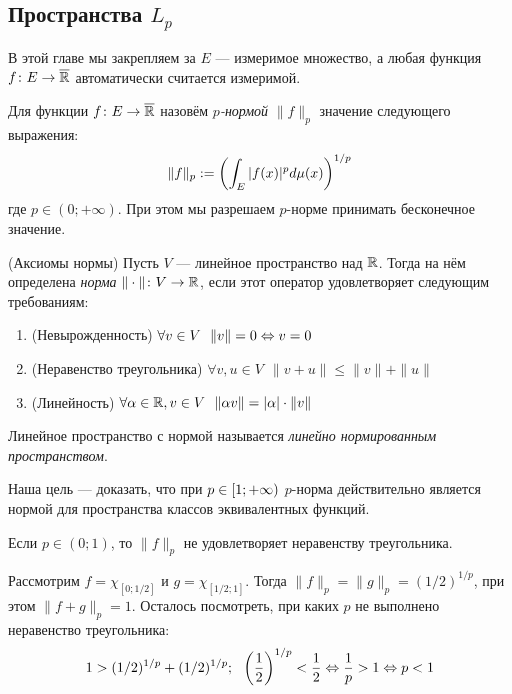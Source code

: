 \subsection{Пространства $L_p$}

\begin{note}
	В этой главе мы закрепляем за $E$ --- измеримое множество, а любая функция $f \colon E \to \overline{\mathbb{R}}$ автоматически считается измеримой.
\end{note}

\begin{definition}
	Для функции $f \colon E \to \overline{\mathbb{R}}$ назовём \textit{$p$-нормой} $\|f\|_p$ значение следующего выражения:
	\[
		\|f\|_p := \left(\int_E |f(x)|^pd\mu(x)\right)^{1/p}
	\]
	где $p \in (0; +\infty)$. При этом мы разрешаем $p$-норме принимать бесконечное значение.
\end{definition}

\begin{reminder} (Аксиомы нормы)
	Пусть $V$ --- линейное пространство над $\mathbb{R}$. Тогда на нём определена \textit{норма} $\|\cdot\| \colon V \to \mathbb{R}$, если этот оператор удовлетворяет следующим требованиям:
	\begin{enumerate}
		\item (Невырожденность) \(\forall v \in V\ \ \|v\| = 0 \Lra v = 0\)
		
		\item (Неравенство треугольника) \(\forall v, u \in V\ \ \|v + u\| \le \|v\| + \|u\|\)
		
		\item (Линейность) \(\forall \alpha \in \mathbb{R}, v \in V\ \ \|\alpha v\| = |\alpha| \cdot \|v\|\)
	\end{enumerate}
	Линейное пространство с нормой называется \textit{линейно нормированным пространством}.
\end{reminder}

\begin{note}
	Наша цель --- доказать, что при $p \in \left[1; +\infty\right)$ $p$-норма действительно является нормой для пространства классов эквивалентных функций.
\end{note}

\begin{note}
	Если $p \in (0; 1)$, то $\|f\|_p$ не удовлетворяет неравенству треугольника.
	
	Рассмотрим $f = \chi_{[0; 1/2]}$ и $g = \chi_{[1/2; 1]}$. Тогда $\|f\|_p = \|g\|_p = (1/2)^{1/p}$, при этом $\|f + g\|_p = 1$. Осталось посмотреть, при каких $p$ не выполнено неравенство треугольника:
	\[
		1 > (1/2)^{1/p} + (1/2)^{1/p};\ \ \left(\frac{1}{2}\right)^{1/p} < \frac{1}{2} \Leftrightarrow \frac{1}{p} > 1 \Leftrightarrow p < 1 
	\]
\end{note}

